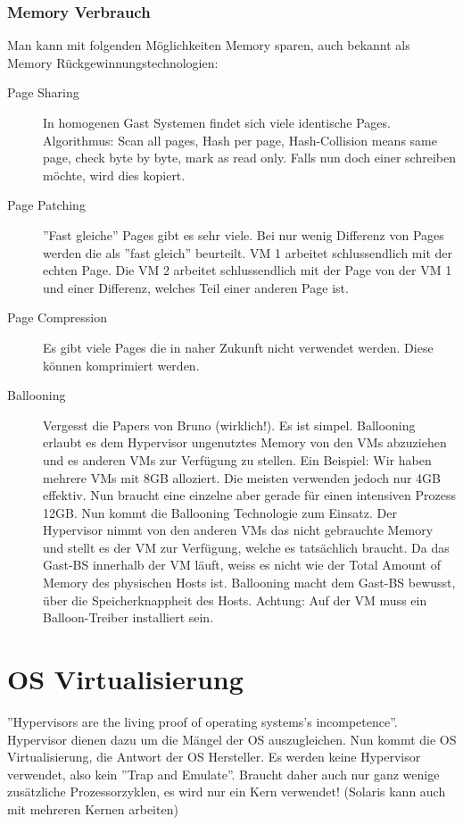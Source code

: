 \subsubsection{Memory Verbrauch}
\label{sec:ballooning}
Man kann mit folgenden Möglichkeiten Memory sparen, auch bekannt als Memory Rückgewinnungstechnologien:
\begin{description}
	\item[Page Sharing] In homogenen Gast Systemen findet sich viele identische Pages. Algorithmus: Scan all pages, Hash per page, Hash-Collision means same page, check byte by byte, mark as read only. Falls nun doch einer schreiben möchte, wird dies kopiert.
	\item[Page Patching] ''Fast gleiche'' Pages gibt es sehr viele. Bei nur wenig Differenz von Pages werden die als ''fast gleich'' beurteilt. VM 1 arbeitet schlussendlich mit der echten Page. Die VM 2 arbeitet schlussendlich mit der Page von der VM 1 und einer Differenz, welches Teil einer anderen Page ist.
	\item[Page Compression] Es gibt viele Pages die in naher Zukunft nicht verwendet werden. Diese können komprimiert werden.
	
	\item[Ballooning] Vergesst die Papers von Bruno (wirklich!). Es ist simpel. Ballooning erlaubt es dem Hypervisor ungenutztes Memory von den VMs abzuziehen und es anderen VMs zur Verfügung zu stellen. Ein Beispiel: Wir haben mehrere VMs mit 8GB alloziert. Die meisten verwenden jedoch nur 4GB effektiv. Nun braucht eine einzelne aber gerade für einen intensiven Prozess 12GB. Nun kommt die Ballooning Technologie zum Einsatz. Der Hypervisor nimmt von den anderen VMs das nicht gebrauchte Memory und stellt es der VM zur Verfügung, welche es tatsächlich braucht. Da das Gast-BS innerhalb der VM läuft, weiss es nicht wie der Total Amount of Memory des physischen Hosts ist. Ballooning macht dem Gast-BS bewusst, über die Speicherknappheit des Hosts. Achtung: Auf der VM muss ein Balloon-Treiber installiert sein.
\end{description}

\section{OS Virtualisierung}
''Hypervisors are the living proof of operating systems's incompetence''. Hypervisor dienen dazu um die Mängel der OS auszugleichen. Nun kommt die OS Virtualisierung, die Antwort der OS Hersteller.
Es werden keine Hypervisor verwendet, also kein ''Trap and Emulate''. Braucht daher auch nur ganz wenige zusätzliche Prozessorzyklen, es wird nur ein Kern verwendet! (Solaris kann auch mit mehreren Kernen arbeiten)

